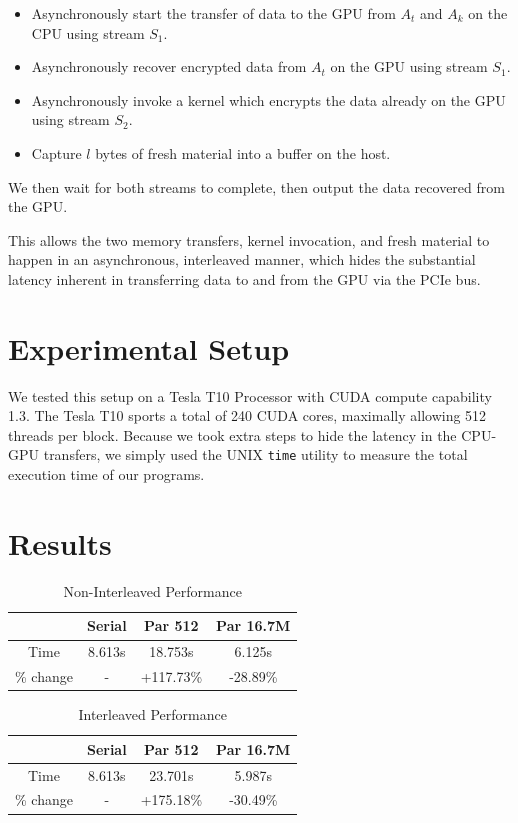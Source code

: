 \documentclass[twocolumn]{article}
\begin{document}
  \begin{itemize}
    \item Asynchronously start the transfer of data to the GPU from $A_t$ and $A_k$ on the CPU using stream $S_1$.
    \item Asynchronously recover encrypted data from $A_t$ on the GPU using stream $S_1$.
    \item Asynchronously invoke a kernel which encrypts the data already on the GPU using stream $S_2$.
    \item Capture $l$ bytes of fresh material into a buffer on the host.
  \end{itemize}
  
  We then wait for both streams to complete, then output the data recovered from the GPU.
  
  This allows the two memory transfers, kernel invocation, and fresh material to happen in an asynchronous, interleaved manner, which hides the substantial latency inherent in transferring data to and from the GPU via the PCIe bus.

  
  \section{Experimental Setup}
  
  We tested this setup on a Tesla T10 Processor with CUDA compute capability 1.3. The Tesla T10 sports a total of 240 CUDA cores, maximally allowing 512 threads per block. Because we took extra steps to hide the latency in the CPU-GPU transfers, we simply used the UNIX \texttt{time} utility to measure the total execution time of our programs.
  
  \section{Results}
  
  \begin{table}
  \centering
  \begin{tabular}{ c | c | c | c }
   & Serial & Par 512 & Par 16.7M \\ \hline
  Time & 8.613s & 18.753s & 6.125s \\ 
  \% change & - & +117.73\% & -28.89\% \\
  \end{tabular}
  \caption{Non-Interleaved Performance}
  \end{table} 
  
  \begin{table}
  \centering
  \begin{tabular}{ c | c | c | c }
   & Serial & Par 512 & Par 16.7M \\ \hline
  Time & 8.613s & 23.701s & 5.987s \\ 
  \% change & - & +175.18\% & -30.49\% \\
  \end{tabular}
  \caption{Interleaved Performance}
  \end{table} 
  
\end{document}
